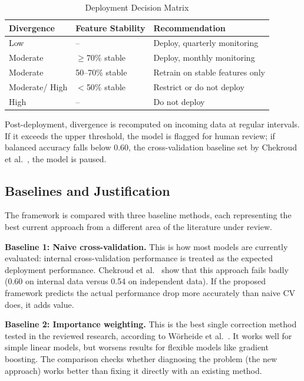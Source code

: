 \begin{table}[H]
\centering
\small
\caption{Deployment Decision Matrix}
\label{tab:decisions}
\begin{tabular}{p{1.6cm} p{2.0cm} p{3.5cm}}
\toprule
\textbf{Divergence} & \textbf{Feature Stability} & \textbf{Recommendation} \\
\midrule
Low                  & --                        & Deploy, quarterly monitoring \\
Moderate             & $\geq$70\% stable          & Deploy, monthly monitoring \\
Moderate             & 50--70\% stable            & Retrain on stable features only \\
Moderate/ High      & $<$50\% stable             & Restrict or do not deploy \\
High                 & --                        & Do not deploy \\
\bottomrule
\end{tabular}
\end{table}

Post-deployment, divergence is recomputed on incoming data at regular intervals. If it exceeds the upper threshold, the model is flagged for human review; if balanced accuracy falls below 0.60, the cross-validation baseline set by Chekroud et al.~\cite{chekroud2024illusory}, the model is paused.

\subsection{Baselines and Justification}

The framework is compared with three baseline methods, each representing the best current approach from a different area of the literature under review.

\textbf{Baseline 1: Naive cross-validation.} This is how most models are currently evaluated: internal cross-validation performance is treated as the expected deployment performance. Chekroud et al.~\cite{chekroud2024illusory} show that this approach fails badly (0.60 on internal data versus 0.54 on independent data). If the proposed framework predicts the actual performance drop more accurately than naive CV does, it adds value.

\textbf{Baseline 2: Importance weighting.} This is the best single correction method tested in the reviewed research, according to W\"{o}rheide et al.~\cite{worheide2021shift}. It works well for simple linear models, but worsens results for flexible models like gradient boosting. The comparison checks whether diagnosing the problem (the new approach) works better than fixing it directly with an existing method.

